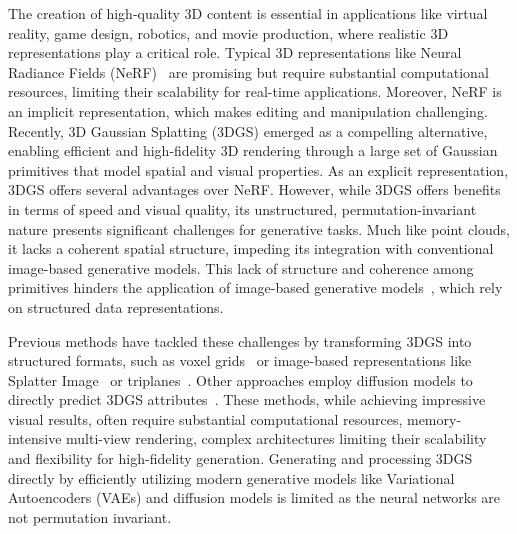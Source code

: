 The creation of high-quality 3D content is essential in applications like virtual reality, game design, robotics, and  movie production, where realistic 3D representations play a critical role. Typical 3D representations like Neural Radiance Fields (NeRF)~\cite{nerf2021} are promising but require substantial computational resources, limiting their scalability for real-time applications. Moreover, NeRF is an implicit representation, which makes editing and manipulation challenging.
Recently, 3D Gaussian Splatting (3DGS) \cite{3dgs2023} emerged as a compelling alternative, enabling efficient and high-fidelity 3D rendering through a large set of Gaussian primitives that model spatial and visual properties.
As an explicit representation, 3DGS offers several advantages over NeRF.
However, while 3DGS offers benefits in terms of speed and visual quality, its unstructured, permutation-invariant nature presents significant challenges for generative tasks. Much like point clouds, it lacks a coherent spatial structure, impeding its integration with conventional image-based generative models. This lack of structure and coherence among primitives hinders the application of image-based generative models~\cite{shapesplat2024, diffgs2024, gaussiancube2024}, which rely on structured data representations.

Previous methods have tackled these challenges by transforming 3DGS into structured formats, such as voxel grids~\cite{gaussiancube2024, sdfusion2023, gvgen2025} or image-based representations like Splatter Image~\cite{splatterimage2024} or triplanes~\cite{zou2024triplane}. Other approaches employ diffusion models to directly predict 3DGS attributes~\cite{gsd2024}. These methods, while achieving impressive visual results, often require substantial computational resources, memory-intensive multi-view rendering, complex architectures limiting their scalability and flexibility for high-fidelity generation.
Generating and processing 3DGS directly by efficiently utilizing modern generative models like Variational Autoencoders (VAEs) and diffusion models is limited as the neural networks are not permutation invariant. %


